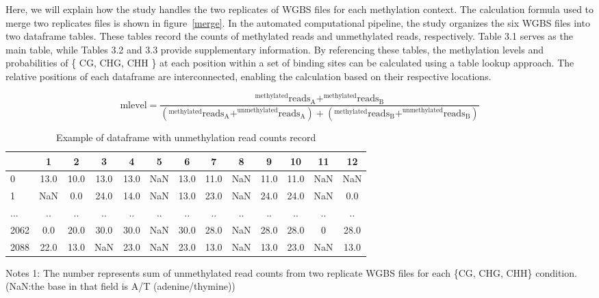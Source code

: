 \documentclass{PHlab-thesis}
\begin{document}
Here, we will explain how the study handles the two replicates of WGBS files for each methylation context. The calculation formula used to merge two replicates files is shown in figure~\ref{merge}. In the automated computational pipeline, the study organizes the six WGBS files into two dataframe tables. These tables record the counts of methylated reads and unmethylated reads, respectively. Table 3.1 serves as the main table, while Tables 3.2 and 3.3 provide supplementary information. By referencing these tables, the methylation levels and probabilities of \{ CG, CHG, CHH \} at each position within a set of binding sites can be calculated using a table lookup approach. The relative positions of each dataframe are interconnected, enabling the calculation based on their respective locations.\begin{small}
\begin{equation} \label{merge}
	 \text{mlevel} = \frac{^{\text{methylated}}\text{reads}_{\text{A}} + ^{\text{methylated}}\text{reads}_{\text{B}}}{(^{\text{methylated}}\text{reads}_{\text{A}} + ^{\text{unmethylated}}\text{reads}_{\text{A}})+ (^{\text{methylated}}\text{reads}_{\text{B}} + ^{\text{unmethylated}}\text{reads}_{\text{B}})}
\end{equation}
\end{small}
\begin{table}[H]
	\centering
	\begin{tabular}{l*{12}{c}}
		\toprule
		         & 1 &  2&  3&4  &5&6&7&8&  9& 10 & 11&12\\
		\midrule
		
		0     &13.0  &10.0  &13.0  &13.0   &NaN  &13.0  &11.0   &NaN &11.0  &11.0   &NaN   &NaN\\
		1     &NaN   &0.0  &24.0  &14.0  &NaN  &13.0  &23.0   &NaN  &24.0  &24.0  &NaN   &0.0\\
		...   &.. &.. &.. &.. &.. &.. &.. &.. &.. &.. &.. &..\\
		
		2062   &0.0  &20.0  &30.0  &30.0   &NaN  &30.0  &28.0   &NaN  &28.0  &28.0   &0  &28.0\\
		2088 &22.0  &13.0   &NaN  &23.0   &NaN  &23.0  &13.0  &NaN  &13.0  &23.0   &NaN  &13.0\\
		\bottomrule
	\end{tabular}
	\begin{minipage}{15.5cm}
		\vspace{0.1cm}
		\footnotesize  Notes 1: The number represents sum of unmethylated read counts from two replicate WGBS files for each \{CG, CHG, CHH\} condition. (NaN:the base in that field is A/T (adenine/thymine))
	\end{minipage}
	\caption{Example of dataframe with unmethylation read counts record}
	\label{table:unmethylated}
\end{table}
\end{document}
